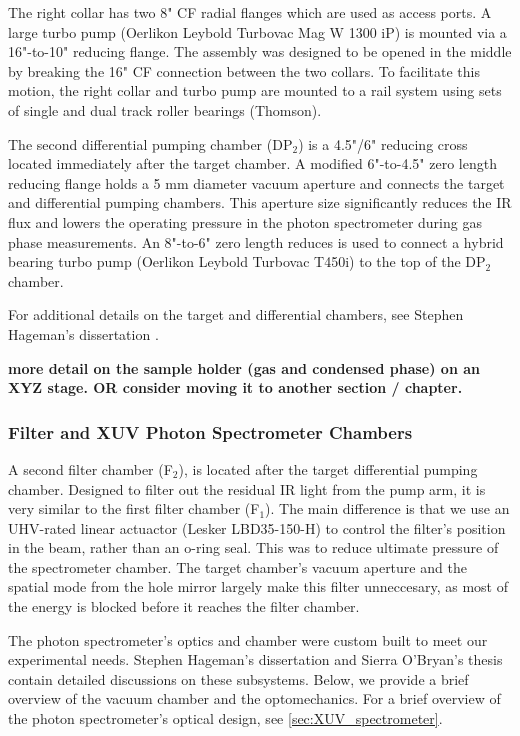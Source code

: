 The right collar has two 8" CF radial flanges which are used as access ports. A large turbo pump (Oerlikon Leybold Turbovac Mag W 1300 iP) is mounted via a 16"-to-10" reducing flange. The assembly was designed to be opened in the middle by breaking the 16" CF connection between the two collars. To facilitate this motion, the right collar and turbo pump are mounted to a rail system using sets of single and dual track roller bearings (Thomson).

The second differential pumping chamber (DP$_2$) is a 4.5"/6" reducing cross located immediately after the target chamber. A modified 6"-to-4.5" zero length reducing flange holds a 5 mm diameter vacuum aperture and connects the target and differential pumping chambers. This aperture size significantly reduces the IR flux and lowers the operating pressure in the photon spectrometer during gas phase measurements. An 8"-to-6" zero length reduces is used to connect a hybrid bearing turbo pump (Oerlikon Leybold Turbovac T450i) to the top of the DP$_2$ chamber.

For additional details on the target and differential chambers, see Stephen Hageman's dissertation \cite{hagemanComplexAttosecondTransientAbsorption2020}.

\textbf{more detail on the sample holder (gas and condensed phase) on an XYZ stage. OR consider moving it to another section / chapter.}

\subsubsection{ Filter and XUV Photon Spectrometer Chambers}

A second filter chamber (F$_2$), is located after the target differential pumping chamber. Designed to filter out the residual IR light from the pump arm, it is very similar to the first filter chamber (F$_1$). The main difference is that we use an UHV-rated linear actuactor (Lesker LBD35-150-H) to control the filter's position in the beam, rather than an o-ring seal. This was to reduce ultimate pressure of the spectrometer chamber. The target chamber's vacuum aperture and the spatial mode from the hole mirror largely make this filter unneccesary, as most of the energy is blocked before it reaches the filter chamber.

The photon spectrometer's optics and chamber were custom built to meet our experimental needs. Stephen Hageman's dissertation \cite{hagemanComplexAttosecondTransientAbsorption2020} and Sierra O'Bryan's thesis \cite{obryanHighResolutionXUV2015} contain detailed discussions on these subsystems. Below, we provide a brief overview of the vacuum chamber and the optomechanics. For a brief overview of the photon spectrometer's optical design, see \cref{sec:XUV_spectrometer}.

